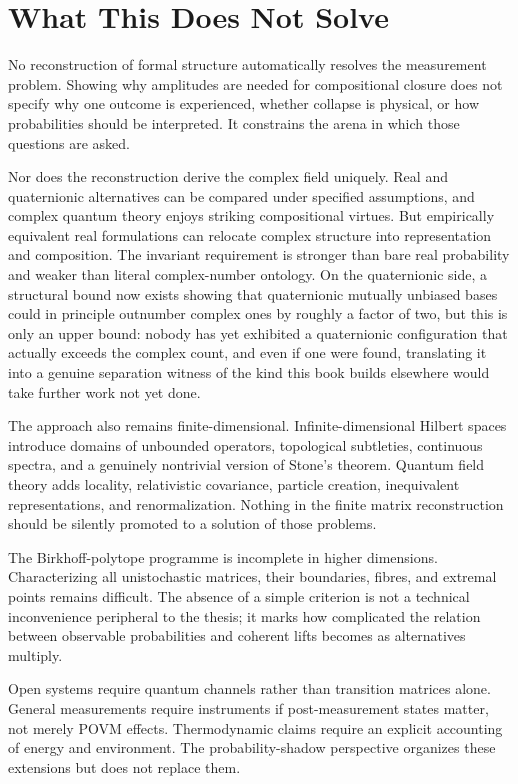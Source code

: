 \documentclass[12pt,openany]{book}
\begin{document}
\chapter{What This Does Not Solve}
No reconstruction of formal structure automatically resolves the measurement problem. Showing why amplitudes are needed for compositional closure does not specify why one outcome is experienced, whether collapse is physical, or how probabilities should be interpreted. It constrains the arena in which those questions are asked.

Nor does the reconstruction derive the complex field uniquely. Real and quaternionic alternatives can be compared under specified assumptions, and complex quantum theory enjoys striking compositional virtues. But empirically equivalent real formulations can relocate complex structure into representation and composition. The invariant requirement is stronger than bare real probability and weaker than literal complex-number ontology. On the quaternionic side, a structural bound now exists showing that quaternionic mutually unbiased bases could in principle outnumber complex ones by roughly a factor of two, but this is only an upper bound: nobody has yet exhibited a quaternionic configuration that actually exceeds the complex count, and even if one were found, translating it into a genuine separation witness of the kind this book builds elsewhere would take further work not yet done.

The approach also remains finite-dimensional. Infinite-dimensional Hilbert spaces introduce domains of unbounded operators, topological subtleties, continuous spectra, and a genuinely nontrivial version of Stone's theorem. Quantum field theory adds locality, relativistic covariance, particle creation, inequivalent representations, and renormalization. Nothing in the finite matrix reconstruction should be silently promoted to a solution of those problems.

The Birkhoff-polytope programme is incomplete in higher dimensions. Characterizing all unistochastic matrices, their boundaries, fibres, and extremal points remains difficult. The absence of a simple criterion is not a technical inconvenience peripheral to the thesis; it marks how complicated the relation between observable probabilities and coherent lifts becomes as alternatives multiply.

Open systems require quantum channels rather than transition matrices alone. General measurements require instruments if post-measurement states matter, not merely POVM effects. Thermodynamic claims require an explicit accounting of energy and environment. The probability-shadow perspective organizes these extensions but does not replace them.
\end{document}
